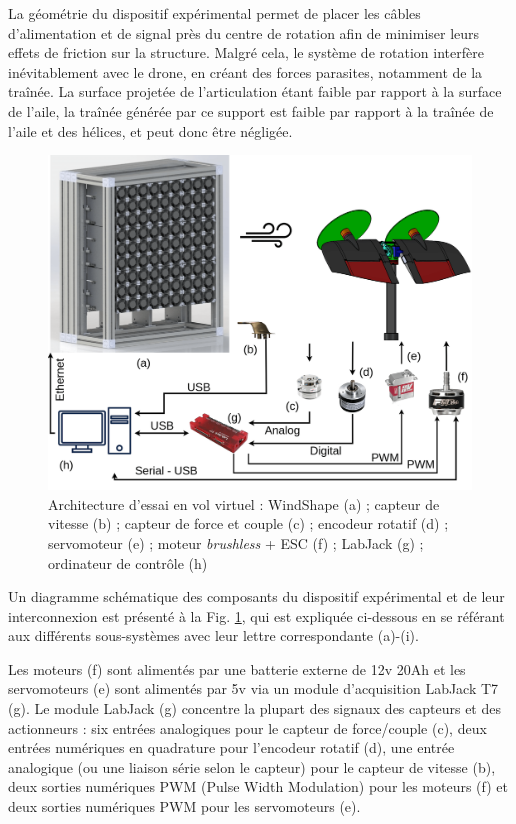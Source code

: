 La géométrie du dispositif expérimental permet de placer les câbles d'alimentation et de signal près du centre de rotation afin de minimiser leurs effets de friction sur la structure. Malgré cela, le système de rotation interfère inévitablement avec le drone, en créant des forces parasites, notamment de la traînée. La surface projetée de l'articulation étant faible par rapport à la surface de l'aile, la traînée générée par ce support est faible par rapport à la traînée de l'aile et des hélices, et peut donc être négligée.

\begin{figure}[!ht]
    \includegraphics[width=\columnwidth]{figures/maquette-min.png}
    \caption{Architecture d'essai en vol virtuel : WindShape (a) ; capteur de vitesse (b) ; capteur de force et couple (c) ; encodeur rotatif (d) ; servomoteur (e) ; moteur \textit{brushless} + ESC (f) ; LabJack (g) ; ordinateur de contrôle (h)}
    \label{fig:archi}
\end{figure}
Un diagramme schématique des composants du dispositif expérimental et de leur interconnexion est présenté à la Fig. \ref{fig:archi}, qui est expliquée ci-dessous en se référant aux différents sous-systèmes avec leur lettre correspondante (a)-(i).

Les moteurs (f) sont alimentés par une batterie externe de 12v 20Ah et les servomoteurs (e) sont alimentés par 5v via un module d'acquisition LabJack T7 \cite[]{LabJack} (g). Le module LabJack (g) concentre la plupart des signaux des capteurs et des actionneurs : six entrées analogiques pour le capteur de force/couple (c), deux entrées numériques en quadrature pour l'encodeur rotatif (d), une entrée analogique (ou une liaison série selon le capteur) pour le capteur de vitesse (b), deux sorties numériques PWM (Pulse Width Modulation)  pour les moteurs (f) et deux sorties numériques PWM pour les servomoteurs (e). 

